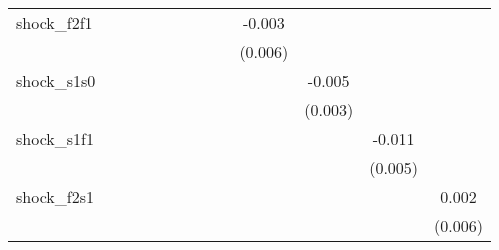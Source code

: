 {\begin{tabular}{l*{12}{c}}
\addlinespace
shock\_f2f1  &                     &                     &                     &                     &                     &                     &                     &                     &      -0.003         &                     &                     &                     \\
            &                     &                     &                     &                     &                     &                     &                     &                     &     (0.006)         &                     &                     &                     \\
\addlinespace
shock\_s1s0  &                     &                     &                     &                     &                     &                     &                     &                     &                     &      -0.005         &                     &                     \\
            &                     &                     &                     &                     &                     &                     &                     &                     &                     &     (0.003)         &                     &                     \\
\addlinespace
shock\_s1f1  &                     &                     &                     &                     &                     &                     &                     &                     &                     &                     &      -0.011\sym{**} &                     \\
            &                     &                     &                     &                     &                     &                     &                     &                     &                     &                     &     (0.005)         &                     \\
\addlinespace
shock\_f2s1  &                     &                     &                     &                     &                     &                     &                     &                     &                     &                     &                     &       0.002         \\
            &                     &                     &                     &                     &                     &                     &                     &                     &                     &                     &                     &     (0.006)         \\

\end{tabular}}
